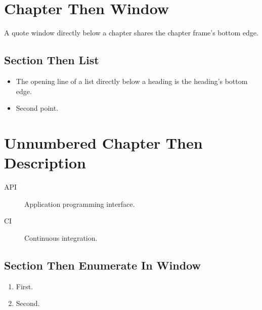 \documentclass[type=report,theme=light,language=en]{semio}
\begin{document}
\chapter{Chapter Then Window}
\begin{Blockquote}
A quote window directly below a chapter shares the chapter frame's bottom edge.
\end{Blockquote}
\section{Section Then List}
\begin{itemize}
\item The opening line of a list directly below a heading is the heading's bottom edge.
\item Second point.
\end{itemize}
\chapter*{Unnumbered Chapter Then Description}
\begin{description}
\item[API] Application programming interface.
\item[CI] Continuous integration.
\end{description}
\section{Section Then Enumerate In Window}
\begin{Window}[title={Inside}]
\begin{enumerate}
\item First.
\item Second.
\end{enumerate}
\end{Window}
\end{document}
